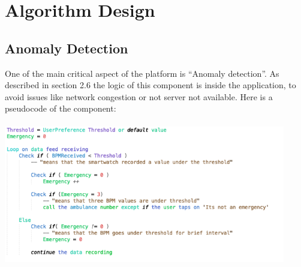 \newpage
\section{Algorithm Design}

	\subsection{Anomaly Detection}
	One of the main critical aspect of the platform is “Anomaly detection”. As described in section 2.6 the logic of this component is inside the application, to avoid issues like network congestion or not server not available.
		Here is a pseudocode of the component:
		\\\\
		\centering
		\includegraphics[height=6.00cm,keepaspectratio]{Figures/EmercencyPseudoCode}